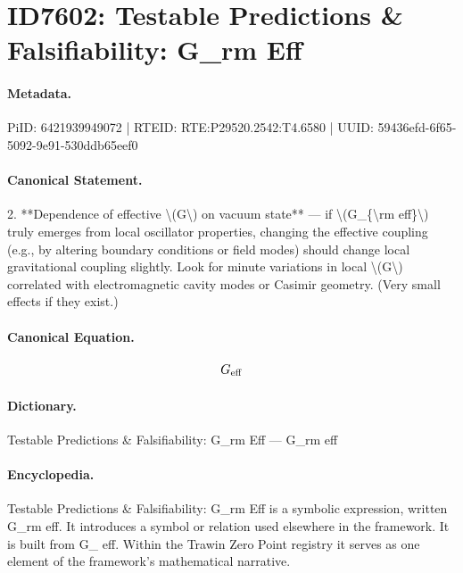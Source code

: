 \section*{ID7602: Testable Predictions \& Falsifiability: G\_rm Eff}
\paragraph{Metadata.}
PiID: 6421939949072 | RTEID: RTE:P29520.2542:T4.6580 | UUID: 59436efd-6f65-5092-9e91-530ddb65eef0

\paragraph{Canonical Statement.}
2. **Dependence of effective \textbackslash{}(G\textbackslash{}) on vacuum state** — if \textbackslash{}(G\_\{\textbackslash{}rm eff\}\textbackslash{}) truly emerges from local oscillator properties, changing the effective coupling (e.g., by altering boundary conditions or field modes) should change local gravitational coupling slightly. Look for minute variations in local \textbackslash{}(G\textbackslash{}) correlated with electromagnetic cavity modes or Casimir geometry. (Very small effects if they exist.)

\paragraph{Canonical Equation.}
\[
G_{\rm eff}
\]

\paragraph{Dictionary.}
Testable Predictions \& Falsifiability: G\_rm Eff — G\_rm eff

\paragraph{Encyclopedia.}
Testable Predictions \& Falsifiability: G\_rm Eff is a symbolic expression, written G\_rm eff. It introduces a symbol or relation used elsewhere in the framework. It is built from G\_ eff. Within the Trawin Zero Point registry it serves as one element of the framework's mathematical narrative.
